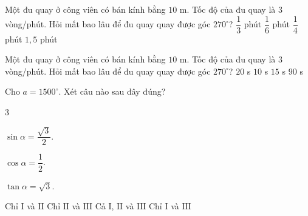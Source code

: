 \begin{ex}%
	Một đu quay  ở công viên có bán kính bằng $10$ m. Tốc độ của đu quay là $3$ vòng/phút. Hỏi mất bao lâu để đu quay quay được góc $270^{\circ}$?
	 \choice
		{$\dfrac{1}{3}$ phút} 
		{$\dfrac{1}{6}$  phút}
		{\True $\dfrac{1}{4}$ phút} 
		{$1{,}5$ phút} 
\end{ex}

\begin{ex}%
	Một đu quay ở công viên có bán kính bằng $10$ m. Tốc độ của đu quay là $3$ vòng/phút. Hỏi mất bao lâu để đu quay quay được góc $270^\circ$? 
	 \choice
		{$20$ s} 
		 {$10$ s}
		 {\True $15$ s}
		{$90$  s}
\end{ex}

\begin{ex}%
	Cho $a=1500^\circ$. Xét  câu nào sau đây đúng?
	\begin{enumEX}[I.]{3}
		 \item $\sin \alpha =\dfrac{\sqrt{3}}{2}$.
		 \item $ \cos \alpha =\dfrac{1}{2}$.
		\item $  \tan \alpha =\sqrt{3}$.
	\end{enumEX}
	 \choice
		{Chỉ $\mathrm{I}$ và $\mathrm{II}$} 
		 {Chỉ $\mathrm{II}$ và $\mathrm{III}$}
		{\True  Cả $\mathrm{I}$, $\mathrm{II}$ và $\mathrm{III}$}
		{Chỉ $\mathrm{I}$  và $\mathrm{III}$}
\end{ex}

